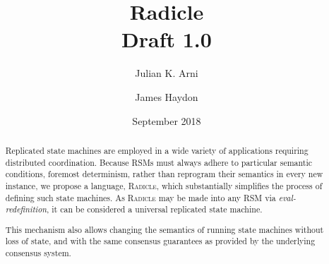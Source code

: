 \documentclass[a4paper, oneside, 9pt, draft]{amsart}
\title[Radicle]{Radicle \\ {\tiny Draft 1.0}}
\author{\Small Julian K. Arni}
\author{\Small James Haydon}
\date{September 2018}
\newcommand{\rads}{\textsc{\footnotesize{Radicle}}}
\begin{document}
\begin{abstract}
    Replicated state machines are employed in a wide variety of applications
    requiring distributed coordination. Because RSMs must always adhere to
    particular semantic conditions, foremost determinism, rather than reprogram
    their semantics in every new instance, we propose a language, \rads{}, which
    substantially simplifies the process of defining such state machines. As
    \rads{} may be made into any RSM via \emph{eval-redefinition}, it can be
    considered a universal replicated state machine.

    This mechanism also allows changing the semantics of running state machines
    without loss of state, and with the same consensus guarantees as provided
    by the underlying consensus system.
\end{abstract}
\maketitle

\setlength{\columnsep}{20pt}
\begin{multicols}{2}








\end{multicols}

\appendix


\end{document}
